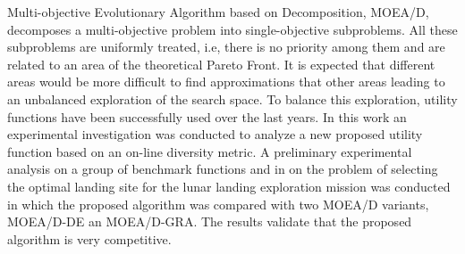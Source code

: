 Multi-objective Evolutionary Algorithm based on Decomposition, MOEA/D, decomposes a multi-objective problem into single-objective subproblems. All these subproblems are uniformly treated, i.e, there is no priority among them and are related to an area of the theoretical Pareto Front. It is expected that different areas would be more difficult to find approximations that other areas leading to an unbalanced exploration of the search space. To balance this exploration, utility functions have been successfully used over the last years. In this work an experimental investigation was conducted to analyze a new proposed utility function based on an on-line diversity metric. A preliminary experimental analysis on a group of benchmark functions and in on the problem of selecting the optimal landing site for the lunar landing exploration mission was conducted in which the proposed algorithm was compared with two MOEA/D variants, MOEA/D-DE an MOEA/D-GRA. The results validate that the proposed algorithm is very competitive.